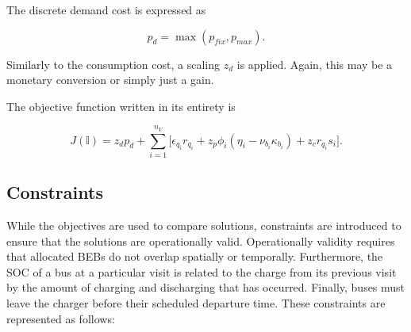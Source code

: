 \documentclass[energies,article,submit,moreauthors]{Definitions/mdpi}
\newcommand{\I}{\mathbb{I}}                 %
\begin{document}
The discrete demand cost is expressed as

\begin{equation}
\label{eq:pd-dis}
  p_d = \max(p_{fix}, p_{max})\text{.}
\end{equation}

Similarly to the consumption cost, a scaling \(z_d\) is applied. Again, this may be a monetary conversion or simply just a
gain.

The objective function written in its entirety is

\begin{equation}
\label{eq:objective-function}
  J(\I) = z_d p_d + \sum_{i=1}^{n_V} \Big[ \epsilon_{q_i}r_{q_i} + z_p \phi_i(\eta_i - \nu_{b_i} \kappa_{b_i}) + z_c r_{q_i} s_i \Big] \text{.}
\end{equation}

\subsection{Constraints}
\label{sec:sa-constraints}
While the objectives are used to compare solutions, constraints are introduced to ensure that the solutions are
operationally valid. Operationally validity requires that allocated BEBs do not overlap spatially or temporally.
Furthermore, the SOC of a bus at a particular visit is related to the charge from its previous visit by the amount of
charging and discharging that has occurred. Finally, buses must leave the charger before their scheduled departure time.
These constraints are represented as follows:
\end{document}
